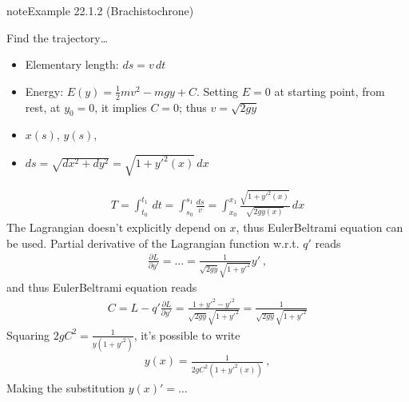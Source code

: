 \documentclass[letterpaper,10pt,english]{jupyterBook}
\begin{document}
\sphinxAtStartPar
{}
\label{ch/calculus-variations/intro:example-1}
\begin{sphinxadmonition}{note}{Example 22.1.2 (Brachistochrone)}



\sphinxAtStartPar
Find the trajectory…
\begin{itemize}
\item {} 
\sphinxAtStartPar
Elementary length: \(ds = v \, dt\)

\item {} 
\sphinxAtStartPar
Energy: \(E(y) = \frac{1}{2} m v^2 - m g y + C\). Setting \(E = 0\) at starting point, from rest, at \(y_0 = 0\), it implies \(C=0\); thus \(v = \sqrt{2gy}\)

\item {} 
\sphinxAtStartPar
\(x(s), \, y(s)\),

\item {} 
\sphinxAtStartPar
\(ds = \sqrt{dx^2 + dy^2} = \sqrt{1+y'^2(x)} \, dx\)

\end{itemize}
\begin{equation*}
\begin{split}T = \int_{t_0}^{t_1} \, dt = \int_{s_0}^{s_1} \frac{ds}{v} = \int_{x_0}^{x_1} \frac{\sqrt{1+y'^2(x)}}{\sqrt{2gy(x)}} \, dx\end{split}
\end{equation*}
\sphinxAtStartPar
The Lagrangian doesn’t explicitly depend on \(x\), thus Euler\sphinxhyphen{}Beltrami equation can be used. Partial derivative of the Lagrangian function w.r.t. \(q'\) reads
\begin{equation*}
\begin{split}\frac{\partial L}{\partial y'} = ... = \frac{1}{\sqrt{2 g y} \sqrt{1+y'^2}} y' \ ,\end{split}
\end{equation*}
\sphinxAtStartPar
and thus Euler\sphinxhyphen{}Beltrami equation reads
\begin{equation*}
\begin{split}C = L - q' \frac{\partial L}{\partial y'} = \frac{ 1 + y'^2 - y'^2}{\sqrt{2 g y} \sqrt{1+y'^2}} = \frac{1}{\sqrt{2 g y} \sqrt{1+y'^2}}\end{split}
\end{equation*}
\sphinxAtStartPar
Squaring \(2 g C^2 = \frac{1}{y(1+y'^2)}\), it’s possible to write
\begin{equation*}
\begin{split}y(x) = \frac{1}{2gC^2(1+y'^2(x))} \ ,\end{split}
\end{equation*}
\sphinxAtStartPar
Making the substitution \(y(x)' = \dots\)
\end{sphinxadmonition}
\end{document}
